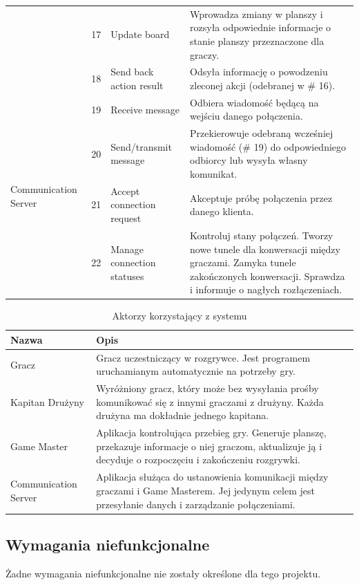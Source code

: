 \documentclass[11pt]{article}
\let\Oldsubsection\subsection
\renewcommand{\subsection}{\FloatBarrier\Oldsubsection}
\begin{document}
\begin{longtable}{|p{}|p{}|p{}|p{}|}
& 17
& Update board
& Wprowadza zmiany w planszy i rozsyła odpowiednie informacje o stanie planszy przeznaczone dla graczy.
\\ \cline{2-4}
& 18
& Send back action result
& Odsyła informację o powodzeniu zleconej akcji (odebranej w \# 16).
\\ \hline
\multirow{4}{.20\textwidth}{Communication Server}
& 19
& Receive message
& Odbiera wiadomość będącą na wejściu danego połączenia.
\\ \cline{2-4}
& 20
& Send/transmit message
& Przekierowuje odebraną wcześniej wiadomość (\# 19) do odpowiedniego odbiorcy lub wysyła własny komunikat.
\\ \cline{2-4}
& 21
& Accept connection request
& Akceptuje próbę połączenia przez danego klienta.
\\ \cline{2-4}
& 22
& Manage connection statuses
& Kontroluj stany połączeń. Tworzy nowe tunele dla konwersacji między graczami. Zamyka tunele zakończonych konwersacji. Sprawdza i informuje o nagłych rozłączeniach.
\\ \hline
\end{longtable}
\FloatBarrier

\begin{longtable}[!h]{|p{}|p{}|}
\caption{Aktorzy korzystający z systemu}
\\ \hline
Nazwa 
& Opis 
\\ \hline
Gracz 
& Gracz uczestniczący w rozgrywce. Jest programem uruchamianym automatycznie na potrzeby gry. 
\\ \hline
Kapitan Drużyny 
& Wyróżniony gracz, który może bez wysyłania prośby komunikować się z innymi graczami z drużyny. Każda drużyna ma dokładnie jednego kapitana. 
\\ \hline
Game Master
& Aplikacja kontrolująca przebieg gry. Generuje planszę, przekazuje informacje o niej graczom, aktualizuje ją i decyduje o rozpoczęciu i zakończeniu rozgrywki.
\\ \hline
Communication Server
& Aplikacja służąca do ustanowienia komunikacji między graczami i Game Masterem. Jej jedynym celem jest przesyłanie danych i zarządzanie połączeniami.
\\ \hline
\end{longtable}
\FloatBarrier

\subsection{Wymagania niefunkcjonalne}
\par
Żadne wymagania niefunkcjonalne nie zostały określone dla tego projektu.
\end{document}
